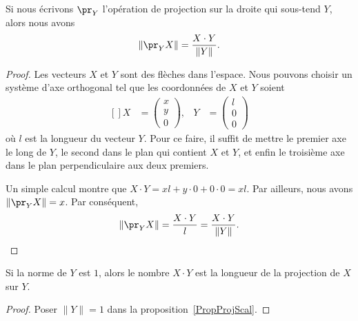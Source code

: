 \begin{proposition}     \label{PropProjScal}
	Si nous écrivons \( \pr_Y\) l'opération de projection sur la droite qui sous-tend \( Y\), alors nous avons
	\begin{equation}
		\| \pr_YX \|=\frac{ X\cdot Y }{ \| Y \| }.
	\end{equation}
\end{proposition}

\begin{proof}
	Les vecteurs \( X\) et \( Y\) sont des flèches dans l'espace. Nous pouvons choisir un système d'axe orthogonal tel que les coordonnées de \( X\) et \( Y\) soient
	\begin{equation}
		\begin{aligned}[]
			X & =\begin{pmatrix}
				     x \\
				     y \\
				     0
			     \end{pmatrix},
			  & Y                & =\begin{pmatrix}
				                        l \\
				                        0 \\
				                        0
			                        \end{pmatrix}
		\end{aligned}
	\end{equation}
	où \( l\) est la longueur du vecteur \( Y\). Pour ce faire, il suffit de mettre le premier axe le long de \( Y\), le second dans le plan qui contient \( X\) et \( Y\), et enfin le troisième axe dans le plan perpendiculaire aux deux premiers.

	Un simple calcul montre que \( X\cdot Y=xl+y\cdot 0+0\cdot 0=xl\). Par ailleurs, nous avons \( \| \pr_YX \|=x\). Par conséquent,
	\begin{equation}
		\| \pr_YX \|=\frac{ X\cdot Y }{ l }=\frac{ X\cdot Y }{ \| Y \| }.
	\end{equation}
\end{proof}

\begin{corollary}
	Si la norme de \( Y\) est \( 1\), alors le nombre \( X\cdot Y\) est la longueur de la projection de \( X\) sur \( Y\).
\end{corollary}

\begin{proof}
	Poser \( \| Y \|=1\) dans la proposition~\ref{PropProjScal}.
\end{proof}

